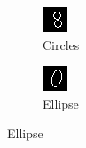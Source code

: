 \documentclass[conference]{IEEEtran}
\begin{document}
\begin{figure}[h]
\begin{subfigure}{.20\columnwidth}
        \includegraphics[width=.90\textwidth]{./images/issues/excluded-G-0-circle.png}
        \caption{Circles}
    \end{subfigure}%
    \begin{subfigure}{.20\columnwidth}
        \centering
        \includegraphics[width=.90\textwidth]{./images/issues/excluded-G-0-el-circle.png}
        \caption{Ellipse}

\end{subfigure}
\end{figure}
\end{document}
